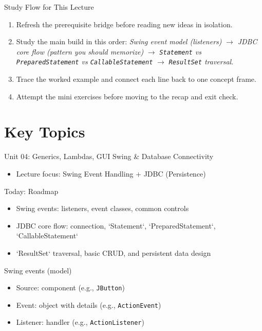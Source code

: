 \documentclass{beamer}
\begin{document}
\begin{frame}{Study Flow for This Lecture}
\begin{enumerate}[<+->]
  \item Refresh the prerequisite bridge before reading new ideas in isolation.
  \item Study the main build in this order: \textit{Swing event model (listeners)} $\rightarrow$ \textit{JDBC core flow (pattern you should memorize)} $\rightarrow$ \textit{\texttt{Statement} vs \texttt{PreparedStatement} vs \texttt{CallableStatement}} $\rightarrow$ \textit{\texttt{ResultSet} traversal}.
  \item Trace the worked example and connect each line back to one concept frame.
  \item Attempt the mini exercises before moving to the recap and exit check.
\end{enumerate}
  \slidesources{\OOPSUnitIVSources}
\end{frame}


\section{Key Topics}
\label{sec:concepts}

\begin{frame}{Unit 04: Generics, Lambdas, GUI Swing \& Database Connectivity}
  \begin{itemize}[<+->]
    \item Lecture focus: Swing Event Handling + JDBC (Persistence)
  \end{itemize}
  \slidesources{\OOPSUnitIVSources}
\end{frame}

\begin{frame}{Today: Roadmap}
  \begin{itemize}[<+->]
    \item Swing events: listeners, event classes, common controls
    \item JDBC core flow: connection, `Statement`, `PreparedStatement`, `CallableStatement`
    \item `ResultSet` traversal, basic CRUD, and persistent data design
  \end{itemize}
  \slidesources{\OOPSUnitIVSources}
\end{frame}

\begin{frame}{Swing events (model)}
  \begin{itemize}[<+->]
    \item Source: component (e.g., \texttt{JButton})
    \item Event: object with details (e.g., \texttt{ActionEvent})
    \item Listener: handler (e.g., \texttt{ActionListener})
  \end{itemize}
  \slidesources{\OOPSUnitIVSources}
\end{frame}
\end{document}

